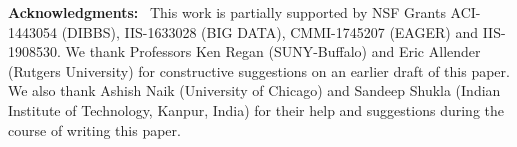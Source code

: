 \documentclass{svproc}
\begin{document}
















\vspace*{.2in}

\noindent
{\bf Acknowledgments:}~
This work is partially supported by
NSF Grants  ACI-1443054 (DIBBS),
IIS-1633028 (BIG DATA), 
CMMI-1745207 (EAGER) and IIS-1908530.
We thank Professors Ken Regan (SUNY-Buffalo) and Eric Allender (Rutgers University)
for constructive suggestions on an earlier draft of this paper.
We also thank Ashish Naik (University of Chicago) and 
Sandeep Shukla (Indian Institute of Technology, Kanpur, India) 
for their help and suggestions during the course of writing this paper.

\clearpage



\clearpage

\setcounter{page}{0}
\thispagestyle{empty}


\end{document}
